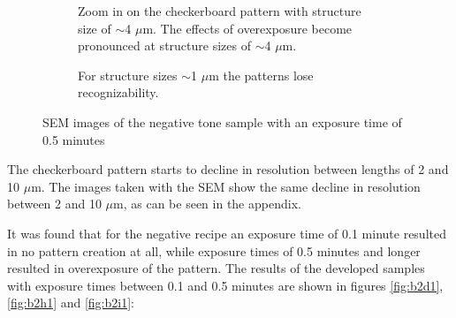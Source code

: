 \begin{figure}[ht]
\begin{subfigure}[t]{0.3\linewidth}
	\caption{Zoom in on the checkerboard pattern with structure size of $\sim$4 $\mu$m. The effects of overexposure become pronounced at structure sizes of $\sim$4 $\mu$m.}
	\label{fig:b2d9_q9}
\end{subfigure}
\hspace*{5mm}
    \begin{subfigure}[t]{0.3\linewidth}
	\centering
	\caption{For structure sizes $\sim$1 $\mu$m the patterns lose recognizability.}
	\label{fig:b2d10_q11}
\end{subfigure}
\caption{SEM images of the negative tone sample with an exposure time of 0.5 minutes}
\end{figure}

The checkerboard pattern starts to decline in resolution between lengths of 2 and 10 $\mu$m. The images taken with the SEM show the same decline in resolution between 2 and 10 $\mu$m, as can be seen in the appendix.


It was found that for the negative recipe an exposure time of 0.1 minute resulted in no pattern creation at all, while exposure times of 0.5 minutes and longer resulted in overexposure of the pattern. The results of the developed samples with exposure times between 0.1 and 0.5 minutes are shown in figures \ref{fig:b2d1}, \ref{fig:b2h1} and \ref{fig:b2i1}:

